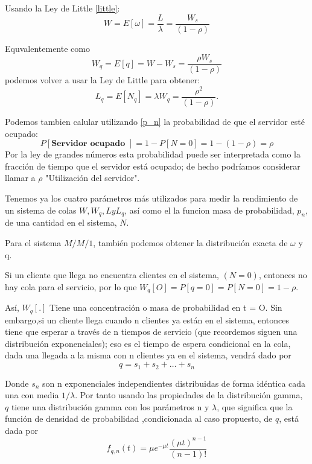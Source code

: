 \documentclass[a4paper,10pt]{scrartcl}
\theoremstyle{definition}
\numberwithin{equation}{section}
\begin{document}
Usando la Ley de Little \ref{little}:
\begin{equation*}
  W=E[\omega]=\frac{L}{\lambda}=\frac{W_s}{(1-\rho)}
\end{equation*}

Equvalentemente como \[ W_q=E[q]=W-W_s=\frac{\rho W_s}{(1-\rho)} \] podemos volver a usar la Ley de Little 
para obtener:
\begin{equation*}
  L_q=E[N_q]=\lambda W_q=\frac{\rho^2}{(1-\rho)}.
\end{equation*}

Podemos tambien calular utilizando \ref{p_n} la probabilidad de que el servidor esté ocupado:
\begin{equation*}
  P[\textbf{Servidor ocupado }]=1-P[N=0]=1-(1-\rho)=\rho
\end{equation*}
Por la ley de grandes números esta probabilidad puede ser interpretada como la fracción de tiempo que el 
servidor está ocupado; de hecho podríamos considerar llamar a $\rho$ "Utilización del servidor".

Tenemos ya los cuatro parámetros más utilizados para medir la rendimiento de un sistema de colas 
$W, W_q, L y L_q$, así como el la funcion masa de probabilidad, $p_n$, de una cantidad en el sistema, $N$. 

Para el sistema $M / M / 1$, también podemos obtener la distribución exacta de $\omega$ y q.

Si un cliente que llega no encuentra clientes en el sistema, $(N = 0)$, entonces no hay cola para el 
servicio, por lo que $W_q [O] = P [q = 0] = P [N = 0] = 1 - \rho$.

Así, $W_q [.]$ Tiene una concentración o masa de probabilidad en t = O. 
Sin embargo,si un cliente llega cuando n clientes ya están en el sistema, entonces tiene que esperar a
través de n tiempos de servicio (que recordemos siguen una distribución exponenciales); eso es el tiempo
de espera condicional en la cola, dada una llegada a la misma con n clientes ya en el sistema, vendrá dado por
\[q = s_1 + s_2 + \dots + s_n\]

Donde $s_n$ son n exponenciales independientes distribuidas de forma idéntica cada una con media $1 / \lambda$.  Por tanto usando las propiedades de la distribución gamma, $q$ tiene una distribución gamma con los parámetros n y $\lambda$, que significa que la función de densidad de probabilidad ,condicionada al caso propuesto, de $q$, está dada por
\begin{equation*}
  f_{q,n}(t)=\mu e^{-\mu t} \frac{(\mu t)^{n-1}}{(n-1)!}
\end{equation*}
\end{document}
